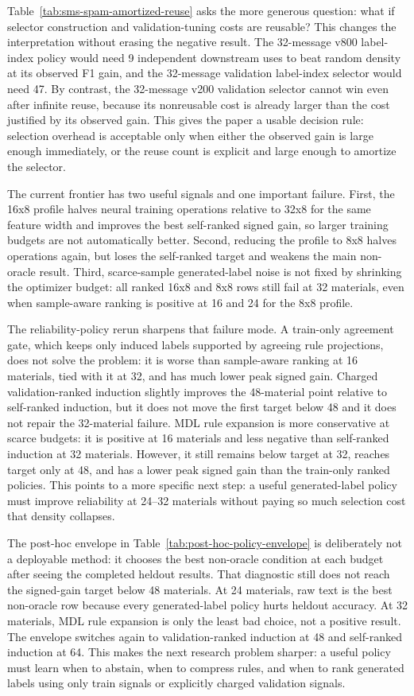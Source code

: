 \documentclass[11pt]{article}
\begin{document}
Table~\ref{tab:sms-spam-amortized-reuse} asks the more generous question: what
if selector construction and validation-tuning costs are reusable? This changes
the interpretation without erasing the negative result. The 32-message v800
label-index policy would need 9 independent downstream uses to beat random
density at its observed F1 gain, and the 32-message validation label-index
selector would need 47. By contrast, the 32-message v200 validation selector
cannot win even after infinite reuse, because its nonreusable cost is already
larger than the cost justified by its observed gain. This gives the paper a
usable decision rule: selection overhead is acceptable only when either the
observed gain is large enough immediately, or the reuse count is explicit and
large enough to amortize the selector.

The current frontier has two useful signals and one important failure. First,
the 16x8 profile halves neural training operations relative to 32x8 for the
same feature width and improves the best self-ranked signed gain, so larger
training budgets are not automatically better. Second, reducing the profile to
8x8 halves operations again, but loses the self-ranked target and weakens the
main non-oracle result. Third, scarce-sample generated-label noise is not fixed
by shrinking the optimizer budget: all ranked 16x8 and 8x8 rows still fail at
32 materials, even when sample-aware ranking is positive at 16 and 24 for the
8x8 profile.

The reliability-policy rerun sharpens that failure mode. A train-only agreement
gate, which keeps only induced labels supported by agreeing rule projections,
does not solve the problem: it is worse than sample-aware ranking at 16
materials, tied with it at 32, and has much lower peak signed gain. Charged
validation-ranked induction slightly improves the 48-material point relative to
self-ranked induction, but it does not move the first target below 48 and it
does not repair the 32-material failure. MDL rule expansion is more conservative
at scarce budgets: it is positive at 16 materials and less negative than
self-ranked induction at 32 materials. However, it still remains below target at
32, reaches target only at 48, and has a lower peak signed gain than the
train-only ranked policies. This points to a more specific next step: a useful
generated-label policy must improve reliability at 24--32 materials without
paying so much selection cost that density collapses.

The post-hoc envelope in Table~\ref{tab:post-hoc-policy-envelope} is
deliberately not a deployable method: it chooses the best non-oracle condition
at each budget after seeing the completed heldout results. That diagnostic
still does not reach the signed-gain target below 48 materials. At 24 materials,
raw text is the best non-oracle row because every generated-label policy hurts
heldout accuracy. At 32 materials, MDL rule expansion is only the least bad
choice, not a positive result. The envelope switches again to validation-ranked
induction at 48 and self-ranked induction at 64. This makes the next research
problem sharper: a useful policy must learn when to abstain, when to compress
rules, and when to rank generated labels using only train signals or explicitly
charged validation signals.
\end{document}
